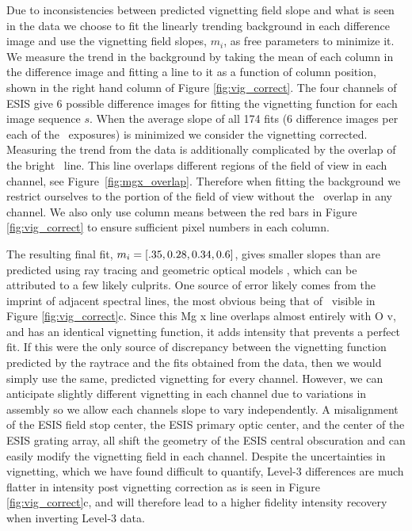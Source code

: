 Due to inconsistencies between predicted vignetting field slope and what is seen in the data we choose to fit the linearly trending background in each difference image and use the vignetting field slopes, $m_i$, as free parameters to minimize it.
We measure the trend in the background by taking the mean of each column in the difference image and fitting a line to it as a function of column position, shown in the right hand column of Figure \ref{fig:vig_correct}.
The four channels of ESIS give 6 possible difference images for fitting the vignetting function for each image sequence $s$. 
When the average slope of all 174 fits (6 difference images per each of the \numDataFrames \ exposures) is minimized we consider the vignetting corrected.
Measuring the trend from the data is additionally complicated by the overlap of the bright \mgxbright \ line.  
This line overlaps different regions of the field of view in each channel, see Figure~\ref{fig:mgx_overlap}.  
Therefore when fitting the background we restrict ourselves to the portion of the field of view without the \mgxbright \ overlap in any channel.
We also only use column means between the red bars in Figure \ref{fig:vig_correct} to ensure sufficient pixel numbers in each column.  

The resulting final fit, $m_i = [.35, 0.28, 0.34, 0.6]$, gives smaller slopes than are predicted using ray tracing and geometric optical models \citep{ESIS}, which can be attributed to a few likely culprits. 
One source of error likely comes from the imprint of adjacent spectral lines, the most obvious being that of \mgxdim \ visible in Figure \ref{fig:vig_correct}c.
Since this Mg {\sc x} line overlaps almost entirely with O {\sc v}, and has an identical vignetting function, it adds intensity that prevents a perfect fit. 
If this were the only source of discrepancy between the vignetting function predicted by the raytrace and the fits obtained from the data, then we would simply use the same, predicted vignetting for every channel. 
However, we can anticipate slightly different vignetting in each channel due to variations in assembly so we allow each channels slope to vary independently.
A misalignment of the ESIS field stop center, the ESIS primary optic center, and the center of the ESIS grating array, all shift the geometry of the ESIS central obscuration and can easily modify the vignetting field in each channel.
Despite the uncertainties in vignetting, which we have found difficult to quantify, Level-3 differences are much flatter in intensity post vignetting correction as is seen in Figure \ref{fig:vig_correct}c, and will therefore lead to a higher fidelity intensity recovery when inverting Level-3 data.


